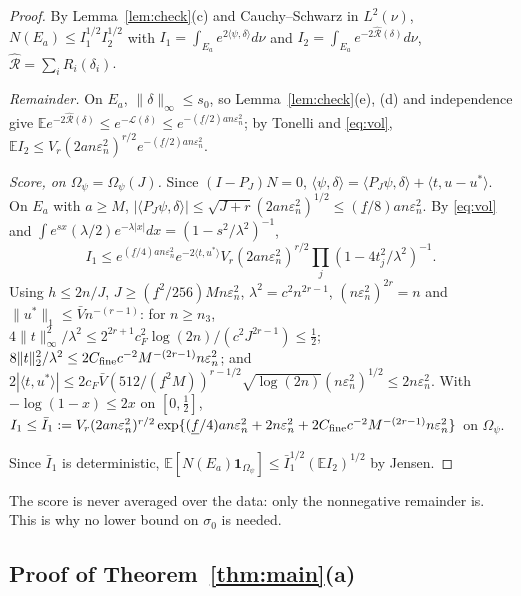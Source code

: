 \documentclass[11pt]{article}
\theoremstyle{definition}
\theoremstyle{remark}
\newcommand{\E}{\mathbb{E}}
\newcommand{\en}{\varepsilon_n}
\newcommand{\Lm}{\mathcal L}
\newcommand{\Rh}{\widehat{\mathcal R}}
\newcommand{\fl}{\underline f}
\newcommand{\Vb}{\bar V}
\newcommand{\ind}{\mathbf 1}
\begin{document}
\begin{proof}
By Lemma~\ref{lem:check}(c) and Cauchy--Schwarz in $L^2(\nu)$,
$N(E_a)\le I_1^{1/2}I_2^{1/2}$ with $I_1=\int_{E_a}e^{2\langle\psi,\delta\rangle}d\nu$ and $I_2=\int_{E_a}e^{-2\Rh(\delta)}d\nu$, $\Rh=\sum_iR_i(\delta_i)$.

\emph{Remainder.} On $E_a$, $\|\delta\|_\infty\le s_0$, so Lemma~\ref{lem:check}(e), (d) and independence give $\E e^{-2\Rh(\delta)}\le e^{-\Lm(\delta)}\le e^{-(\fl/2)an\en^2}$; by Tonelli and \eqref{eq:vol}, $\E I_2\le V_r(2an\en^2)^{r/2}e^{-(\fl/2)an\en^2}$.

\emph{Score, on $\Omega_\psi=\Omega_\psi(J)$.} Since $(I-P_J)N=0$, $\langle\psi,\delta\rangle=\langle P_J\psi,\delta\rangle+\langle t,u-u^{*}\rangle$. On $E_a$ with $a\ge M$, $|\langle P_J\psi,\delta\rangle|\le\sqrt{J+r}(2an\en^2)^{1/2}\le(\fl/8)an\en^2$. By \eqref{eq:vol} and $\int e^{sx}(\lambda/2)e^{-\lambda|x|}dx=(1-s^2/\lambda^2)^{-1}$,
\[
I_1\le e^{(\fl/4)an\en^2}e^{-2\langle t,u^{*}\rangle}V_r(2an\en^2)^{r/2}\prod_j(1-4t_j^2/\lambda^2)^{-1}.
\]
Using $h\le2n/J$, $J\ge(\fl^2/256)Mn\en^2$, $\lambda^2=c^2n^{2r-1}$, $(n\en^2)^{2r}=n$ and $\|u^{*}\|_1\le\Vb n^{-(r-1)}$: for $n\ge n_3$, $4\|t\|_\infty^2/\lambda^2\le2^{2r+1}c_F^2\log(2n)/(c^2J^{2r-1})\le\frac12$; $8\|t\|_2^2/\lambda^2\le2C_{\rm fine}c^{-2}M^{-(2r-1)}n\en^2$; and $2|\langle t,u^{*}\rangle|\le2c_F\Vb(512/(\fl^2M))^{r-1/2}\sqrt{\log(2n)}(n\en^2)^{1/2}\le2n\en^2$. With $-\log(1-x)\le2x$ on $[0,\frac12]$,
$I_1\le\bar I_1:=V_r(2an\en^2)^{r/2}\exp\{(\fl/4)an\en^2+2n\en^2+2C_{\rm fine}c^{-2}M^{-(2r-1)}n\en^2\}$ on $\Omega_\psi$.

Since $\bar I_1$ is deterministic, $\E[N(E_a)\ind_{\Omega_\psi}]\le\bar I_1^{1/2}(\E I_2)^{1/2}$ by Jensen.
\end{proof}

The score is never averaged over the data: only the nonnegative remainder is. This is why no lower bound on $\sigma_0$ is needed.

\subsection{Proof of Theorem~\ref{thm:main}(a)}
\end{document}

